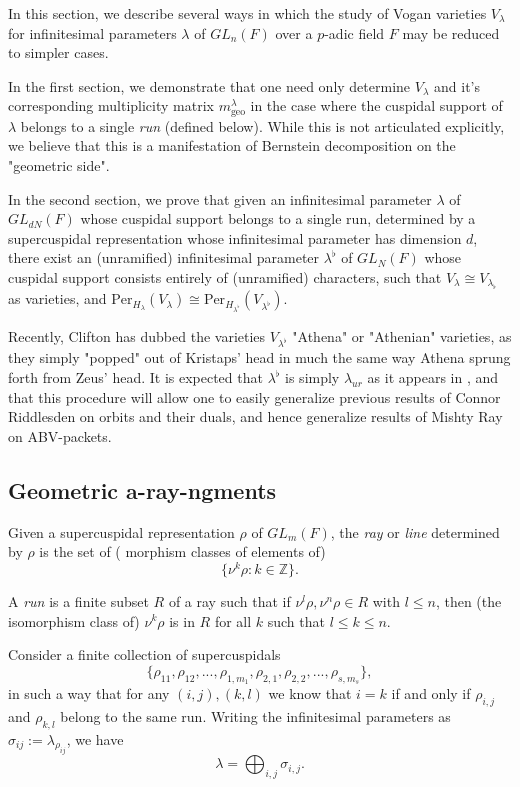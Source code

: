 \documentclass{memoir}
\newcommand{\bz}{\mathbb{Z}}
\newcommand{\tx}{\text}
\theoremstyle{definition}
\begin{document}
	
	
	In this section, we describe several ways in which the study of Vogan varieties $V_\lambda$ for infinitesimal parameters $\lambda$ of $GL_n(F)$ over a $p$-adic field $F$ may be reduced to simpler cases.  
	
	In the first section, we demonstrate that one need only determine $V_\lambda$ and it's corresponding multiplicity matrix $m_{\tx{geo}}^\lambda$ in the case where the cuspidal support of $\lambda$ belongs to a single \emph{run} (defined below).  
	While this is not articulated explicitly, we believe that this is a manifestation of Bernstein decomposition on the "geometric side".
	
	In the second section, we prove that given an infinitesimal parameter $\lambda$ of $GL_{dN}(F)$ whose cuspidal support belongs to a single run, determined by a supercuspidal representation whose infinitesimal parameter has dimension $d$, there exist an (unramified) infinitesimal parameter $\lambda^\flat$ of $GL_N(F)$ whose cuspidal support consists entirely of (unramified) characters, such that $V_\lambda\cong V_{\lambda_\flat}$ as varieties, and $\tx{Per}_{H_\lambda}(V_\lambda)\cong\tx{Per}_{H_{\lambda^\flat}}(V_{\lambda^\flat})$.  
	
	Recently, Clifton has dubbed the varieties $V_{\lambda^\flat}$ "Athena" or "Athenian" varieties, as they simply "popped" out of Kristaps' head in much the same way Athena sprung forth from Zeus' head.  
	It is expected that $\lambda^\flat$ is simply $\lambda_{ur}$ as it appears in \cite{Cun}, and that this procedure will allow one to easily generalize previous results of Connor Riddlesden on orbits and their duals, and hence generalize results of Mishty Ray on ABV-packets.  
	
	\subsection{Geometric a-ray-ngments}
	
	Given a supercuspidal representation $\rho$ of $GL_m(F)$, the \emph{ray} or \emph{line} determined by $\rho$ is the set of ( \tx{iso}morphism classes of elements of) 
	$$\{\nu^k\rho : k\in \bz\}.$$
	
	A \emph{run} is a finite subset $R$ of a ray such that if $\nu^l\rho, \nu^n\rho\in R$ with $l\leq n$, then (the isomorphism class of) $\nu^k\rho$ is in $R$ for all $k$ such that $l\leq k\leq n$.  
	
	Consider a finite collection of supercuspidals 
	$$\{\rho_{11}, \rho_{12}, ..., \rho_{1,m_1}, \rho_{2,1},  \rho_{2, 2}, ..., \rho_{s, m_s}\},$$
	in such a way that for any $(i,j), (k, l)$ we know that $i=k$ if and only if $\rho_{i,j}$ and $\rho_{k,l}$ belong to the same run.  Writing the infinitesimal parameters as $\sigma_{ij}:=\lambda_{\rho_{ij}}$, we have 
	$$\lambda=\bigoplus_{i,j}\sigma_{i,j}.$$
	
\end{document}
